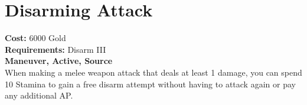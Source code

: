 \section{Disarming Attack}
\textbf{Cost:} 6000 Gold\\
\textbf{Requirements:} Disarm III\\
\textbf{Maneuver, Active, Source}\\
When making a melee weapon attack that deals at least 1 damage, you can spend 10 Stamina to gain a free disarm attempt without having to attack again or pay any additional AP.\\

